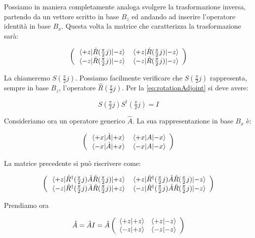 Possiamo in maniera completamente analoga svolgere la trasformazione inversa, partendo da un vettore scritto in base $B_z$ ed andando ad inserire l'operatore identit\`a in base $B_x$. Questa volta la matrice che caratterizza la trasformazione sar\`a:

	\[
		\left ( \begin{array}{c c}
			\mel{+z}{\hat{R} ( \tfrac{\pi}{2} j)}{-z} & \mel{+z}{\hat{R} ( \tfrac{\pi}{2} j)}{-z} \\ 
			\mel{-z}{\hat{R} ( \tfrac{\pi}{2} j)}{-z} & \mel{-z}{\hat{R} ( \tfrac{\pi}{2} j)}{-z} \\ 
		\end{array} \right )
	\]

La chiameremo $S( \tfrac{\pi}{2} j )$. Possiamo facilmente verificare che $S ( \tfrac{\pi}{2} j )$ rappresenta, sempre in base $B_z$, l'operatore $\hat{R} ( \tfrac{\pi}{2} j)$. Per la \eqref{eq:rotationAdjoint} si deve avere:

	\begin{equation}
	  S ( \tfrac{\pi}{2} j ) S^\dagger ( \tfrac{\pi}{2} j ) = I
	\end{equation}

Consideriamo ora un operatore generico $\hat{A}$. La sua rappresentazione in base $B_x$ \`e:

	\[
			\left ( \begin{array}{c c}
				\mel{+x}{\hat{A}}{+x} & \mel{+x}{A}{-x} \\
				\mel{-x}{\hat{A}}{+x} & \mel{-x}{A}{-x}
			\end{array} \right )
	\]

La matrice precedente si pu\`o riscrivere come:

	\begin{equation}
			\left ( \begin{array}{c c}
				\mel{+z}{ \hat{R} ^\dagger( \tfrac{\pi}{2} j) \hat{A} \hat{R} ( \tfrac{\pi}{2} j) }{+z} & 
				\mel{+z}{ \hat{R} ^\dagger( \tfrac{\pi}{2} j) \hat{A} \hat{R} ( \tfrac{\pi}{2} j) }{-z} \\
				\mel{-z}{ \hat{R} ^\dagger( \tfrac{\pi}{2} j) \hat{A} \hat{R} ( \tfrac{\pi}{2} j) }{+z} & 
				\mel{-z}{ \hat{R} ^\dagger( \tfrac{\pi}{2} j) \hat{A} \hat{R} ( \tfrac{\pi}{2} j) }{-z}
			\end{array} \right )
	\end{equation}

Prendiamo ora

	\begin{equation}
		\hat{A} = \hat{A} I = \hat{A} 
			\left ( \begin{array}{c c}
				\braket{+z}{+z} & \braket{+z}{-z} \\
				\braket{-z}{+z} & \braket{-z}{-z}
			\end{array} \right )
	\end{equation}


